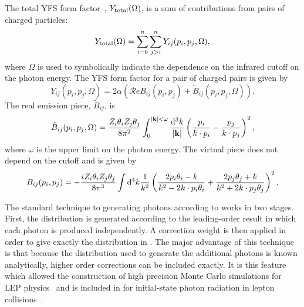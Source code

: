  The total YFS form factor~\cite{Yennie:1961ad}, $Y_{\rm total}(\Omega)$,
  is a sum of contributions from pairs of charged particles:
\begin{equation}
Y_{\rm total}(\Omega) = \sum_{i=0}^n\sum^n_{j>i} Y_{ij}(p_i,p_j,\Omega),
\end{equation}
  where $\Omega$ is used to symbolically indicate the dependence
  on the infrared cutoff on the photon energy.
 The YFS form factor for a pair of charged pairs is given by
\begin{equation}
Y_{ij}(p_i,p_j,\Omega) = 2\alpha
\left(\mathcal{R}e B_{ij}(p_i,p_j)+\tilde{B}_{ij}(p_i,p_j,\Omega)\right).
\end{equation}
  The real emission piece, $\tilde{B}_{ij}$, is
\begin{equation}
\tilde{B}_{ij}(p_i,p_j,\Omega) =
\frac{Z_i\theta_iZ_j\theta_j}{8\pi^2}\int_0^{\left|\mathbf{k}\right|<\omega}
\frac{{\rm {d}}^3k}{\left|\mathbf{k}\right|}
\left(\frac{p_i}{k\cdot p_i}-\frac{p_j}{k\cdot p_j}\right)^2,
\end{equation}
  where $\omega$ is the upper limit on the photon energy.
  The virtual piece does not depend on the cutoff and is given by
\begin{equation}
B_{ij}(p_i,p_j) = -\frac{iZ_i\theta_iZ_j\theta_j}{8\pi^3}
\int {\rm d}^4k \frac1{k^2}
\left(
\frac{2p_i\theta_i-k}{k^2-2k\cdot p_i\theta_i}+
\frac{2p_j\theta_j+k}{k^2+2k\cdot p_j\theta_j}\right)^2.
\end{equation}

The standard technique to generating photons according
to  works in two stages.
First, the distribution is generated according to the leading-order result 
in which each photon is produced independently.
A correction weight is then applied in order to give exactly the
distribution in .
The major advantage of this technique is that because the distribution
used to generate the additional photons is known analytically, higher
order corrections can be included exactly. It is this feature which allowed the construction of high precision 
Monte Carlo simulations for LEP 
physics~\cite{Jadach:1988gb,Jadach:2000ir,Jadach:1999vf,Placzek:2003zg,Jadach:2001mp,Jadach:2001uu}
and is included in \sherpa for initial-state photon radiation in lepton collisions~\cite{Schalicke:2002ck}.


